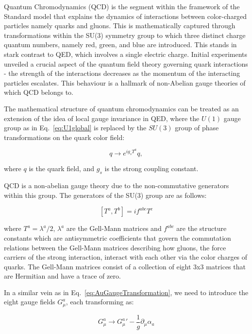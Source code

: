 Quantum Chromodynamics (QCD) is the segment within the framework of the Standard model that explains the dynamics of interactions between color-charged particles namely quarks and gluons. This is mathematically captured through transformations within the SU(3) symmetry group to which three distinct charge quantum numbers, namely red, green, and blue are introduced. This stands in stark contrast to QED, which involves a single electric charge. Initial experiments unveiled a crucial aspect of the quantum field theory governing quark interactions - the strength of the interactions decreases as the momentum of the interacting particles escalates. This behaviour is a hallmark of non-Abelian gauge theories of which QCD belongs to. 

The mathematical structure of quantum chromodynamics can be treated as an extension of the idea of local gauge invariance in QED, where the $U(1)$ gauge group as in Eq.~\ref{eq:U1global} is replaced by the $SU(3)$ group of phase transformations on the quark color field: 

\begin{equation}
    \label{eq:QCDgaugeinv}
    q \rightarrow e^{ig_sT^{a}}q,
\end{equation}

where $q$ is the quark field, and $g_s$ is the strong coupling constant. 

QCD is a non-abelian gauge theory due to the non-commutative generators within this group. The generators of the SU(3) group are as follows:

\begin{equation}
    \label{eq:QCDGenerators}
    [T^a, T^b] = if^{abc} T^c
\end{equation}

where $T^{a} = \lambda^{a}/2$, $\lambda^{a}$ are the Gell-Mann matrices and $f^{abc}$ are the structure constants which are antisymmetric coefficients that govern the commutation relations between the Gell-Mann matrices describing how gluons, the force carriers of the strong interaction, interact with each other via the color charges of quarks. The Gell-Mann matrices consist of a collection of eight 3x3 matrices that are Hermitian and have a trace of zero. 

In a similar vein as in Eq.~\ref{eq:AuGaugeTransformation}, we need to introduce the eight gauge fields $G^{a}_{\mu}$, each transforming as:

\begin{equation}
    \label{eq:QCDGauge}
    G^{a}_{\mu} \rightarrow G^{a}_{\mu}' - \frac{1}{g}\partial_{\mu} \alpha_a
\end{equation}

